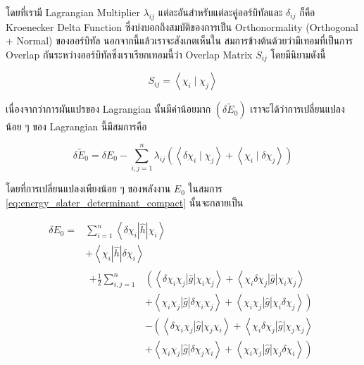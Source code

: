 \noindent โดยที่เรามี Lagrangian Multiplier $\lambda_{i j}$ แต่ละอันสำหรับแต่ละคู่ออร์บิทัลและ $\delta_{i j}$ ก็คือ Kroenecker
Delta Function ซึ่งบ่งบอกถึงสมบัติของการเป็น Orthonormality (Orthogonal + Normal) ของออร์บิทัล นอกจากนี้แล้วเราจะสังเกตเห็นใน%
สมการข้างต้นด้วยว่ามีเทอมที่เป็นการ Overlap กันระหว่างออร์บิทัลซึ่งเราเรียกเทอมนี้ว่า Overlap Matrix $S_{i j}$ โดยมีนิยามดังนี้

\begin{equation}
    S_{i j}
    =
    \left\langle\chi_i \mid \chi_j\right\rangle
\end{equation}

\noindent เนื่องจากว่าการผันแปรของ Lagrangian นั้นมีค่าน้อยมาก $(\delta \tilde{E}_0)$ เราจะได้ว่าการเปลี่ยนแปลงน้อย ๆ ของ
Lagrangian นี้มีสมการคือ

\begin{equation}
    \delta \tilde{E}_0
    = \delta E_0
    - \sum_{i, j=1}^n \lambda_{i j}
    \left(
    \left\langle\delta \chi_i \mid \chi_j\right\rangle
    + \left\langle\chi_i \mid \delta \chi_j\right\rangle
    \right)
\end{equation}

\noindent โดยที่การเปลี่ยนแปลงเพียงน้อย ๆ ของพลังงาน $E_0$ ในสมการ \ref{eq:energy_slater_determinant_compact}
นั้นจะกลายเป็น

\begin{equation}
    \begin{aligned}
        \delta E_0
        = & \sum_{i=1}^n\left\langle\delta \chi_i|\hat{h}| \chi_i\right\rangle                     \\
          & +\left\langle\chi_i|\hat{h}| \delta \chi_i\right\rangle                                \\
          & \begin{aligned} +\frac{1}{2} \sum_{i, j=1}^n
                 & \left( \right. \left\langle\delta \chi_i \chi_j|\hat{g}| \chi_i \chi_j\right\rangle
                + \left\langle\chi_i \delta \chi_j|\hat{g}| \chi_i \chi_j\right\rangle                 \\
                 & +\left\langle\chi_i \chi_j|\hat{g}| \delta \chi_i \chi_j\right\rangle
                +\left\langle\chi_i \chi_j|\hat{g}| \chi_i \delta \chi_j\right\rangle \left. \right)   \\
                 & -\left(\left\langle\delta \chi_i \chi_j|\hat{g}| \chi_j \chi_i\right\rangle \right.
                + \left\langle\chi_i \delta \chi_j|\hat{g}| \chi_j \chi_j\right\rangle                 \\
                 & +\left\langle\chi_i \chi_j|\hat{g}| \delta \chi_j \chi_i\right\rangle
                + \left\langle\chi_i \chi_j|\hat{g}| \chi_j \delta \chi_i\right\rangle \left. \right)
            \end{aligned}
    \end{aligned}
\end{equation}

